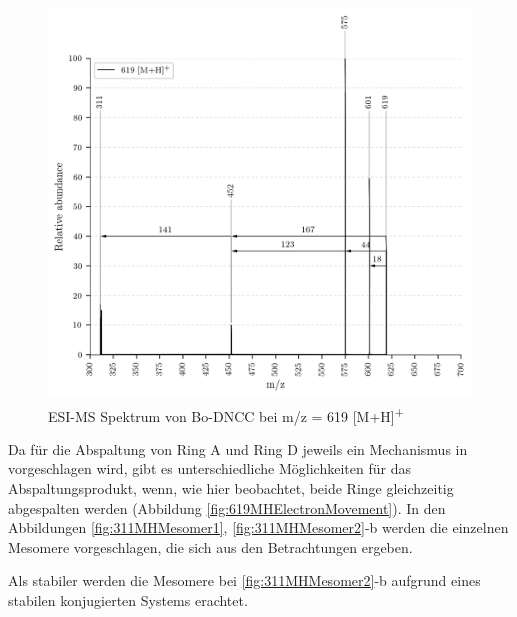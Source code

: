 \begin{figure}[!htbp]
  \centering
  \includegraphics[width=\textwidth, height=0.7\textwidth]{figures/Kapitel7/Kataboliten/VWA_MS_619.png}
  \caption[ESI-MS Spektrum von Bo-DNCC, Quelle: Autor]{ESI-MS Spektrum von Bo-DNCC bei m/z = 619 [M+H]\textsuperscript{+}}
  \label{fig:619MH}
\end{figure}

Da für die Abspaltung von Ring A und Ring D jeweils ein Mechanismus in \cite{StructureElucidation} vorgeschlagen wird, gibt es unterschiedliche Möglichkeiten für das Abspaltungsprodukt, wenn, wie hier beobachtet, beide Ringe gleichzeitig abgespalten werden (Abbildung \ref{fig:619MHElectronMovement}). In den Abbildungen \ref{fig:311MHMesomer1}, \ref{fig:311MHMesomer2}-b werden die einzelnen Mesomere vorgeschlagen, die sich aus den Betrachtungen ergeben. 

Als stabiler werden die Mesomere bei \ref{fig:311MHMesomer2}-b aufgrund eines stabilen konjugierten Systems erachtet.

